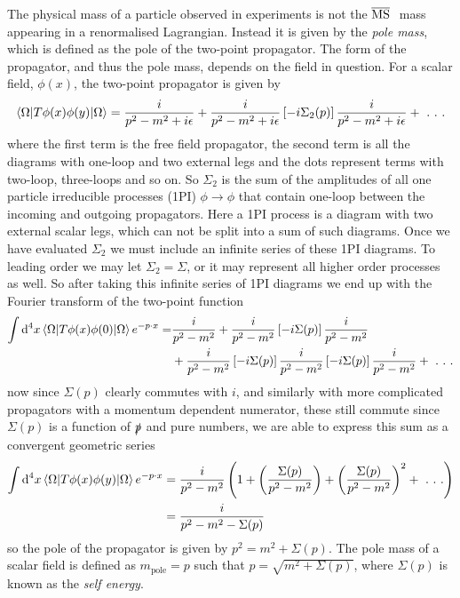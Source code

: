 \documentclass[11pt]{article}
\renewcommand{\d}{\ensuremath{\operatorname{d}\!}}
\begin{document}
The physical mass of a particle observed in experiments is not the \mbox{\footnotesize$\overline{\rm MS}~$} mass appearing in a renormalised Lagrangian.  Instead it is given by the \textit{pole mass}, which is defined as the pole of the two-point propagator.  The form of the propagator, and thus the pole mass, depends on the field in question.  For a scalar field, $\phi(x)$, the two-point propagator is given by
\begin{align}
\braket{\Omega |T\phi(x)\phi(y) | \Omega} = \frac{i}{p^2-m^2+i\epsilon} + \frac{i}{p^2-m^2+i\epsilon}\left[-i\Sigma_2(p)\right]\frac{i}{p^2-m^2+i\epsilon}+ \ . \ . \ . 
\end{align}
where the first term is the free field propagator, the second term is all the diagrams with one-loop and two external legs and the dots represent terms with two-loop, three-loops and so on.  So $\Sigma_2$ is the sum of the amplitudes of all one particle irreducible processes (1PI) $\phi\rightarrow\phi$ that contain one-loop between the incoming and outgoing propagators.  Here a 1PI process is a diagram with two external scalar legs, which can not be split into a sum of such diagrams.  Once we have evaluated $\Sigma_2$ we must include an infinite series of these 1PI diagrams.  To leading order we may let $\Sigma_2=\Sigma$, or it may represent all higher order processes as well.  So after taking this infinite series of 1PI diagrams we end up with the Fourier transform of the two-point function
\begin{align}
\begin{split}
\int \d^4x\braket{\Omega |T\phi(x)\phi(0) | \Omega} e^{-p\cdot x}=& \frac{i}{p^2-m^2} + \frac{i}{p^2-m^2}\left[-i\Sigma(p)\right]\frac{i}{p^2-m^2} \\
& + \frac{i}{p^2-m^2}\left[-i\Sigma(p)\right]\frac{i}{p^2-m^2}\left[-i\Sigma(p)\right]\frac{i}{p^2-m^2}+ \ . \ . \ . 
\end{split}
\end{align}
now since $\Sigma(p)$ clearly commutes with $i$, and similarly with more complicated propagators with a momentum dependent numerator, these still commute since $\Sigma(p)$ is a function of $\slashed{p}$ and pure numbers, we are able to express this sum as a convergent geometric series
\begin{align}
\begin{split}
\int \d^4x\braket{\Omega |T\phi(x)\phi(y) | \Omega} e^{-p\cdot x}&=\frac{i}{p^2-m^2}\left(1 +\left(\frac{\Sigma(p)}{p^2-m^2}\right)+\left(\frac{\Sigma(p)}{p^2-m^2}\right)^2+\ . \ . \ .\right)\\
&=\frac{i}{p^2-m^2-\Sigma(p)}
\end{split}
\end{align}
so the pole of the propagator is given by $p^2 = m^2+\Sigma(p)$.  The pole mass of a scalar field is defined as $m_{\text{pole}}=p$ such that $p=\sqrt{m^2+\Sigma(p)}$, where $\Sigma(p)$ is known as the \textit{self energy}.\\
\end{document}
